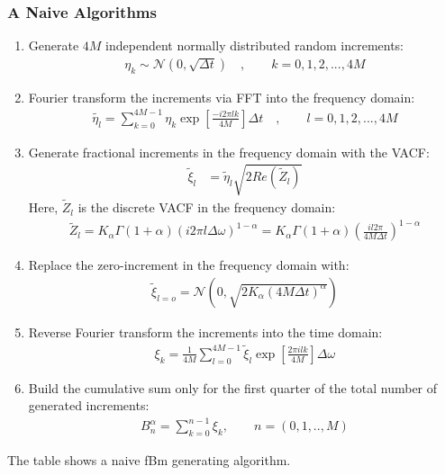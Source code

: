\documentclass[
  a4paper,BCOR10mm,oneside,
  headsepline,footsepline,%
  fleqn,openbib
]{scrbook}
\begin{document}
\subsubsection{A Naive Algorithms}
\begin{table}
\begin{framed}
\begin{enumerate}
 \item Generate $4M$ independent normally distributed random increments: 
\begin{align}
 \eta_k \sim \mathcal{N}(0,\sqrt{\Delta t})\quad, \qquad k=0,1,2,...,4M 
\end{align}
\item Fourier transform the increments via FFT into the frequency domain:
\begin{align}
 \tilde{\eta_l}=\sum_{k=0}^{4M-1} \eta_k \exp\left[\frac{- i 2 \pi  l k }{4M}\right] \Delta t \quad , \qquad  l=0,1,2,...,4M  \label{eq:fouriertrans}
\end{align}

\item Generate fractional increments in the frequency domain with the VACF: 
 \begin{align}
   \tilde{\xi}_{l}&= \tilde{\eta}_l\sqrt{2 Re( \tilde{Z}_l)} \label{eq:problem} 
  \end{align}
 Here,  $ \tilde{Z}_l$ is the discrete VACF in the frequency domain:
  \begin{align}
   \tilde{Z}_l = K_{\alpha} \Gamma(1+\alpha)(i 2 \pi l \Delta \omega)^{1-\alpha} =  K_{\alpha} \Gamma(1+\alpha)\left( \frac{i l 2 \pi}{4 M \Delta t}\right)^{1-\alpha} 
 \end{align}
 
 \item Replace the zero-increment in the frequency domain with:
\begin{align}
 \tilde{\xi}_{l=o} = \mathcal{N}(0,\sqrt{2 K_{\alpha} (4 M \Delta t)^\alpha})
\end{align}
 \item Reverse Fourier transform the increments into the time domain:
 \begin{align}
 \xi_{k}= \frac{1}{4M} \sum_{l=0}^{4M-1}  \tilde{\xi}_l \exp\left[\frac{2 \pi i l k }{4M}\right] \Delta \omega
 \end{align}
 \item Build the cumulative sum only for the first quarter of the total number of generated increments: 
 \begin{align}
   B^{\alpha}_n= \sum^{n-1}_{k=0} \xi_k ,\qquad n=(0,1,..,M)
  \end{align}
\end{enumerate}
\end{framed}
\caption{The table shows a naive fBm generating algorithm.}
\label{naivealgorithm}
 \end{table}
\end{document}
